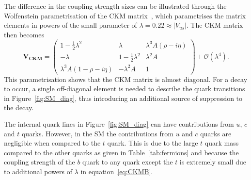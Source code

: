 The difference in the coupling strength sizes can be illustrated through the Wolfenstein parametrisation of the CKM matrix~\cite{PhysRevLett.51.1945}, which parametrises the matrix elements in powers of the small parameter of $\lambda = 0.22 \approx |V_{us}|$. The CKM matrix then becomes
\begin{equation}
\mathbf{V_{CKM}} =
 \begin{pmatrix}
 1 - \frac{1}{2}\lambda^2 & \lambda & \lambda^3 A (\rho - i \eta) \\
 - \lambda                & 1 - \frac{1}{2}\lambda^2 & \lambda^2 A \\
 \lambda^3 A (1 - \rho- i \eta) & -\lambda^2 A & 1
 \end{pmatrix} + \mathcal{O}(\lambda^4).
\label{eq:CKMB}
\end{equation}
This parametrisation shows that the CKM matrix is almost diagonal. For a \bmumu decay to occur, a single off-diagonal element is needed to describe the quark transitions in Figure~\ref{fig:SM_diag}, thus introducing an additional source of suppression to the decay. 

The internal quark lines in Figure~\ref{fig:SM_diag} can have contributions from $u$, $c$ and $t$ quarks. However, in the SM the contributions from $u$ and $c$ quarks are negligible when compared to the $t$ quark. This is due to the large $t$ quark mass compared to the other quarks as given in Table~\ref{tab:fermions} and because the coupling strength of the $b$ quark to any quark except the $t$ is extremely small due to additional powers of $\lambda$ in equation~\ref{eq:CKMB}.


